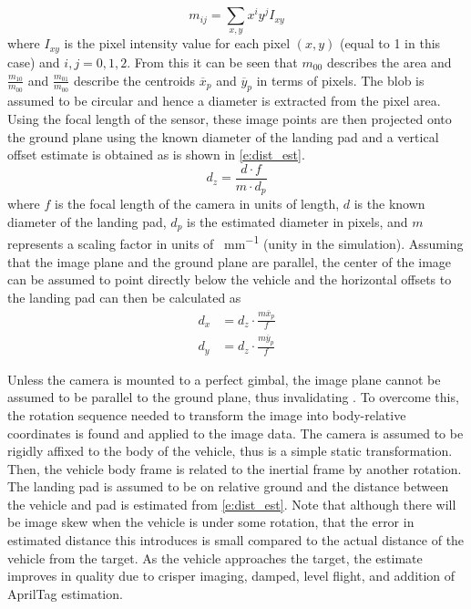 \begin{equation}\label{e:im_moments}
    m_{ij}=\sum_{x,y}x^iy^jI_{xy}
\end{equation}
where $I_{xy}$ is the pixel intensity value for each pixel $(x,y)$ (equal to 1 in this case) and $i,j =
0,1,2$. From this it can be seen that $m_{00}$ describes the area and $\frac{m_{10}}{m_{00}}$ and
$\frac{m_{01}}{m_{00}}$ describe the centroids $\overline{x}_p$ and $\overline{y}_p$ in terms of
pixels\cite{hu1962visual}. The blob is assumed to be circular and hence a diameter is extracted from the pixel
area. Using the focal length of the sensor, these image points are then projected onto the ground plane using
the known diameter of the landing pad and a vertical offset estimate is obtained as is shown in
\cref{e:dist_est}.
\begin{equation}\label{e:dist_est}
    d_z=\frac{d\cdot f}{m\cdot d_p}
\end{equation}
where $f$ is the focal length of the camera in units of length, $d$ is the known diameter of the landing pad,
$d_p$ is the estimated diameter in pixels, and $m$ represents a scaling factor in units of \si{\px\per\mm}
(unity in the simulation).
Assuming that the image plane and the ground plane are parallel, the center of the image can be assumed to
point directly below the vehicle and the horizontal offsets to the landing pad can then be calculated as
\begin{align}\label{e:horiz_est}
    d_x &= d_z\cdot\frac{m\overline{x}_p}{f}\\
    d_y &= d_z\cdot\frac{m\overline{y}_p}{f}\label{e:horiz_est-y}
\end{align}

Unless the camera is mounted to a perfect gimbal, the image plane cannot be assumed to be parallel to the
ground plane, thus invalidating . To overcome this, the rotation
sequence needed to transform the image into body-relative coordinates is found and applied to the image data.
The camera is assumed to be rigidly affixed to the body of the vehicle, thus is a simple static
transformation. Then, the vehicle body frame is related to the inertial frame by another rotation. The landing
pad is assumed to be on relative ground and the distance between the vehicle and pad is estimated from
\cref{e:dist_est}. Note that although there will be image skew when the vehicle is under some rotation, that
the error in estimated distance this introduces is small compared to the actual distance of the vehicle from
the target. As the vehicle approaches the target, the estimate improves in quality due to crisper imaging,
damped, level flight, and addition of AprilTag estimation.

